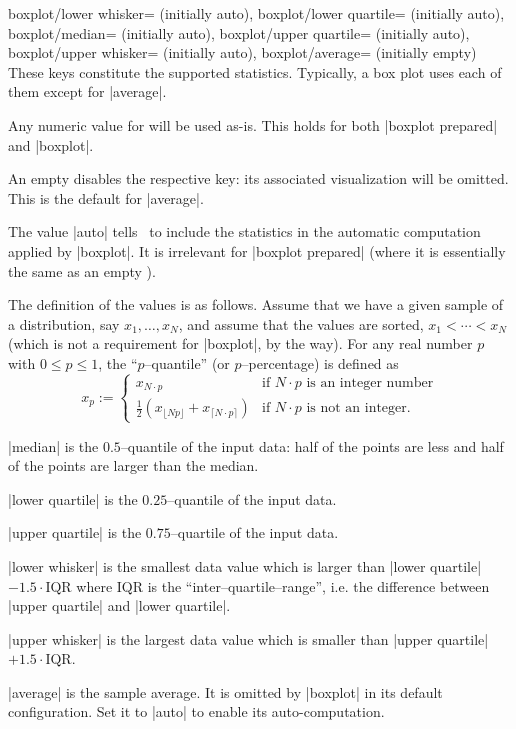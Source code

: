 \begin{pgfplotskeylist}{%
	boxplot/lower whisker= (initially auto),
	boxplot/lower quartile= (initially auto),
	boxplot/median= (initially auto),
	boxplot/upper quartile= (initially auto),
	boxplot/upper whisker= (initially auto),
	boxplot/average= (initially empty)%
}
	These keys constitute the supported statistics. Typically, a box plot uses each of them except for |average|.

	Any numeric value for  will be used as-is. This holds for both |boxplot prepared| and |boxplot|.

	An empty  disables the respective key: its associated visualization will be omitted. This is the default for |average|.

	The value |auto| tells \PGFPlots\ to include the statistics in the automatic computation applied by |boxplot|. It is irrelevant for |boxplot prepared| (where it is essentially the same as an empty ).


	The definition of the values is as follows. Assume that we have a given sample of a distribution, say $x_1,\dotsc,x_N$, and assume that the values are sorted, $x_1 < \dotsb < x_N$ (which is not a requirement for |boxplot|, by the way). For any real number $p$ with $0\le p\le1$, the ``$p$--quantile'' (or $p$--percentage) is defined as
	\[
	x_p :=
	\begin{cases}
	 	x_{N \cdot p} & \text{if $N \cdot p$ is an integer number}\\
		\frac{1}{2} (x_{\lfloor N p \rfloor} + x_{\lceil N \cdot p \rceil}) & \text{if $N \cdot p$ is not an integer.}
	\end{cases}
	\]
	
	|median| is the $0.5$--quantile of the input data: half of the points are less and half of the points are larger than the median.

	|lower quartile| is the $0.25$--quantile of the input data.

	|upper quartile| is the $0.75$--quartile of the input data.

	|lower whisker| is the smallest data value which is larger than |lower quartile|$ -1.5 \cdot \text{IQR}$ where $\text{IQR}$ is the ``inter--quartile--range'', i.e. the difference between |upper quartile| and |lower quartile|.

	|upper whisker| is the largest data value which is smaller than |upper quartile|$+1.5 \cdot \text{IQR}$.
	
	|average| is the sample average. It is omitted by |boxplot| in its default configuration. Set it to |auto| to enable its auto-computation.
\end{pgfplotskeylist}

